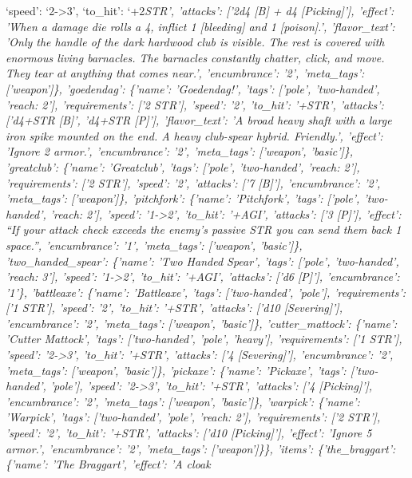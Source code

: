 \documentclass[
  letterpaper,
  DIV=11,
  numbers=noendperiod]{scrartcl}
\begin{document}
`speed': `2-\textgreater3', `to\_hit': `+2\emph{STR', 'attacks': {[}'2d4
{[}B{]} + d4 {[}Picking{]}'{]}, 'effect': 'When a damage die rolls a 4,
inflict 1 {[}bleeding{]} and 1 {[}poison{]}.', 'flavor\_text': 'Only the
handle of the dark hardwood club is visible. The rest is covered with
enormous living barnacles. The barnacles constantly chatter, click, and
move. They tear at anything that comes near.', 'encumbrance': '2',
'meta\_tags': {[}'weapon'{]}\}, 'goedendag': \{'name': 'Goedendag!',
'tags': {[}'pole', 'two-handed', 'reach: 2'{]}, 'requirements': {[}'2
STR'{]}, 'speed': '2', 'to\_hit': '+STR', 'attacks': {[}'d4+STR
{[}B{]}', 'd4+STR {[}P{]}'{]}, 'flavor\_text': 'A broad heavy shaft with
a large iron spike mounted on the end. A heavy club-spear hybrid.
Friendly.', 'effect': 'Ignore 2 armor.', 'encumbrance': '2',
'meta\_tags': {[}'weapon', 'basic'{]}\}, 'greatclub': \{'name':
'Greatclub', 'tags': {[}'pole', 'two-handed', 'reach: 2'{]},
'requirements': {[}'2 STR'{]}, 'speed': '2', 'attacks': {[}'7
{[}B{]}'{]}, 'encumbrance': '2', 'meta\_tags': {[}'weapon'{]}\},
'pitchfork': \{'name': 'Pitchfork', 'tags': {[}'pole', 'two-handed',
'reach: 2'{]}, 'speed': '1-\textgreater2', 'to\_hit': '+AGI', 'attacks':
{[}'3 {[}P{]}'{]}, 'effect': ``If your attack check exceeds the enemy's
passive STR you can send them back 1 space.'', 'encumbrance': '1',
'meta\_tags': {[}'weapon', 'basic'{]}\}, 'two\_handed\_spear': \{'name':
'Two Handed Spear', 'tags': {[}'pole', 'two-handed', 'reach: 3'{]},
'speed': '1-\textgreater2', 'to\_hit': '+AGI', 'attacks': {[}'d6
{[}P{]}'{]}, 'encumbrance': '1'\}, 'battleaxe': \{'name': 'Battleaxe',
'tags': {[}'two-handed', 'pole'{]}, 'requirements': {[}'1 STR'{]},
'speed': '2', 'to\_hit': '+STR', 'attacks': {[}'d10 {[}Severing{]}'{]},
'encumbrance': '2', 'meta\_tags': {[}'weapon', 'basic'{]}\},
'cutter\_mattock': \{'name': 'Cutter Mattock', 'tags': {[}'two-handed',
'pole', 'heavy'{]}, 'requirements': {[}'1 STR'{]}, 'speed':
'2-\textgreater3', 'to\_hit': '+STR', 'attacks': {[}'4
{[}Severing{]}'{]}, 'encumbrance': '2', 'meta\_tags': {[}'weapon',
'basic'{]}\}, 'pickaxe': \{'name': 'Pickaxe', 'tags': {[}'two-handed',
'pole'{]}, 'speed': '2-\textgreater3', 'to\_hit': '+STR', 'attacks':
{[}'4 {[}Picking{]}'{]}, 'encumbrance': '2', 'meta\_tags': {[}'weapon',
'basic'{]}\}, 'warpick': \{'name': 'Warpick', 'tags': {[}'two-handed',
'pole', 'reach: 2'{]}, 'requirements': {[}'2 STR'{]}, 'speed': '2',
'to\_hit': '+STR', 'attacks': {[}'d10 {[}Picking{]}'{]}, 'effect':
'Ignore 5 armor.', 'encumbrance': '2', 'meta\_tags': {[}'weapon'{]}\}\},
'items': \{'the\_braggart': \{'name': 'The Braggart', 'effect': 'A cloak
}
\end{document}
